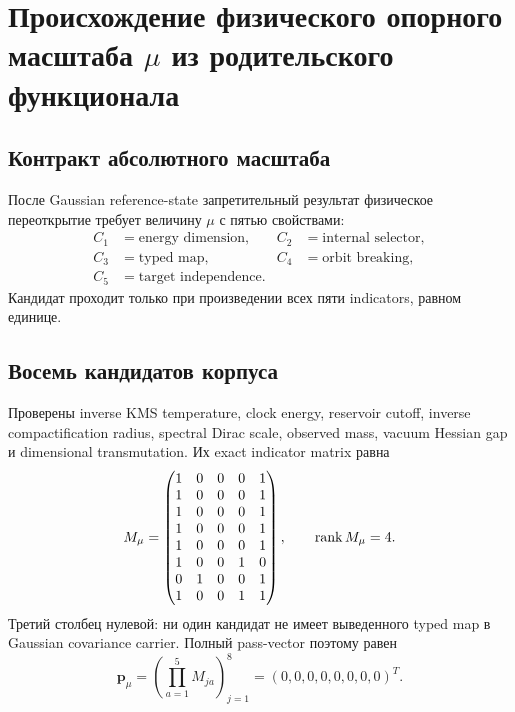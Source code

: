 \chapter{Происхождение физического опорного масштаба \texorpdfstring{$\mu$}{mu} из родительского функционала}
\label{ch:v9-reference-scale-mu-parent-origin}

\section{Контракт абсолютного масштаба}

После Gaussian reference-state запретительный результат физическое переоткрытие требует
величину $\mu$ с пятью свойствами:
\begin{equation}
 \begin{aligned}
 C_1&=\text{energy dimension},&
 C_2&=\text{internal selector},\\
 C_3&=\text{typed map},&
 C_4&=\text{orbit breaking},\\
 C_5&=\text{target independence}.&&
 \end{aligned}
 \label{eq:v9-mu-origin-contract}
\end{equation}
Кандидат проходит только при произведении всех пяти indicators, равном
единице.

\section{Восемь кандидатов корпуса}

Проверены inverse KMS temperature, clock energy, reservoir cutoff,
inverse compactification radius, spectral Dirac scale, observed mass,
vacuum Hessian gap и dimensional transmutation. Их exact indicator matrix
равна
\begin{equation}
 M_\mu=
 \begin{pmatrix}
 1&0&0&0&1\\
 1&0&0&0&1\\
 1&0&0&0&1\\
 1&0&0&0&1\\
 1&0&0&0&1\\
 1&0&0&1&0\\
 0&1&0&0&1\\
 1&0&0&1&1
 \end{pmatrix},
 \qquad \operatorname{rank} M_\mu=4.
 \label{eq:v9-mu-origin-candidate-matrix}
\end{equation}
Третий столбец нулевой: ни один кандидат не имеет выведенного typed map в
Gaussian covariance carrier. Полный pass-vector поэтому равен
\begin{equation}
 \mathbf p_\mu=
 \left(\prod_{a=1}^{5}M_{ja}\right)_{j=1}^{8}
 =(0,0,0,0,0,0,0,0)^T.
 \label{eq:v9-mu-origin-pass-vector}
\end{equation}

